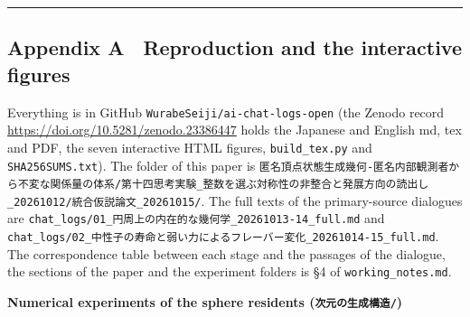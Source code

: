 \documentclass[
  a4paper,
]{article}
\begin{document}
\begin{center}\rule{0.5\linewidth}{0.5pt}\end{center}

\subsection{Appendix A　Reproduction and the interactive
figures}\label{appendix-a-reproduction-and-the-interactive-figures}

Everything is in GitHub \texttt{WurabeSeiji/\allowbreak{}ai-chat-logs-open} (the
Zenodo record \url{https://doi.org/10.5281/zenodo.23386447} holds the Japanese
and English md, tex and PDF, the seven interactive HTML figures,
\texttt{build\_\allowbreak{}tex.py} and \texttt{SHA256SUMS.txt}). The folder of this
paper is
\texttt{匿名頂点状態生成幾何-匿名内部観測者から不変な関係量の体系/\allowbreak{}第十四思考実験\_\allowbreak{}整数を選ぶ対称性の非整合と発展方向の読出し\_\allowbreak{}20261012/\allowbreak{}統合仮説論文\_\allowbreak{}20261015/\allowbreak{}}.
The full texts of the primary-source dialogues are
\texttt{chat\_\allowbreak{}logs/\allowbreak{}01\_\allowbreak{}円周上の内在的な幾何学\_\allowbreak{}20261013-14\_\allowbreak{}full.md} and
\texttt{chat\_\allowbreak{}logs/\allowbreak{}02\_\allowbreak{}中性子の寿命と弱い力によるフレーバー変化\_\allowbreak{}20261014-15\_\allowbreak{}full.md}.
The correspondence table between each stage and the passages of the
dialogue, the sections of the paper and the experiment folders is §4 of
\texttt{working\_\allowbreak{}notes.md}.

\textbf{Numerical experiments of the sphere residents
(\texttt{次元の生成構造/\allowbreak{}})}
\end{document}
